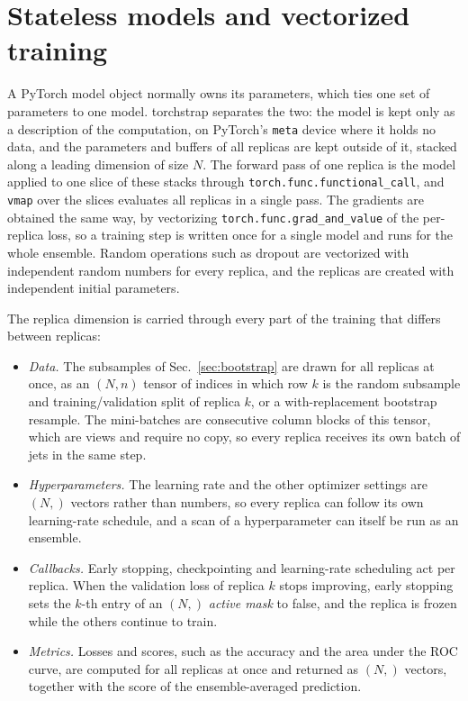 \section{Stateless models and vectorized training}
\label{sec:tsStateless}
A PyTorch model object normally owns its parameters, which ties one set of parameters to one model.
%
torchstrap separates the two: the model is kept only as a description of the computation, on PyTorch's \texttt{meta} device where it holds no data, and the parameters and buffers of all replicas are kept outside of it, stacked along a leading dimension of size \(N\).
%
The forward pass of one replica is the model applied to one slice of these stacks through \texttt{torch.func.functional\_call}, and \texttt{vmap} over the slices evaluates all replicas in a single pass.
%
The gradients are obtained the same way, by vectorizing \texttt{torch.func.grad\_and\_value} of the per-replica loss, so a training step is written once for a single model and runs for the whole ensemble.
%
Random operations such as dropout are vectorized with independent random numbers for every replica, and the replicas are created with independent initial parameters.

The replica dimension is carried through every part of the training that differs between replicas:
\begin{itemize}
	\item \emph{Data.} The subsamples of Sec.~\ref{sec:bootstrap} are drawn for all replicas at once, as an \((N, n)\) tensor of indices in which row \(k\) is the random subsample and training/validation split of replica \(k\), or a with-replacement bootstrap resample. The mini-batches are consecutive column blocks of this tensor, which are views and require no copy, so every replica receives its own batch of jets in the same step.
	\item \emph{Hyperparameters.} The learning rate and the other optimizer settings are \((N,)\) vectors rather than numbers, so every replica can follow its own learning-rate schedule, and a scan of a hyperparameter can itself be run as an ensemble.
	\item \emph{Callbacks.} Early stopping, checkpointing and learning-rate scheduling act per replica. When the validation loss of replica \(k\) stops improving, early stopping sets the \(k\)-th entry of an \((N,)\) \emph{active mask} to false, and the replica is frozen while the others continue to train.
	\item \emph{Metrics.} Losses and scores, such as the accuracy and the area under the ROC curve, are computed for all replicas at once and returned as \((N,)\) vectors, together with the score of the ensemble-averaged prediction.
\end{itemize}

